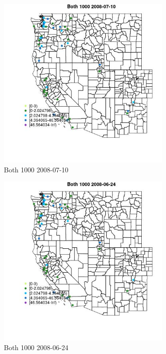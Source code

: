 \begin{figure} 
\centering  
\includegraphics[width=0.77\textwidth]{Code_Outputs/Report_ML_input_PM25_Step4_part_e_de_duplicated_aves_MapObsBoth_10002008-07-10.jpg} 
\caption{\label{fig:Report_ML_input_PM25_Step4_part_e_de_duplicated_avesMapObsBoth_10002008-07-10}Both 1000 2008-07-10} 
\end{figure} 
 

\begin{figure} 
\centering  
\includegraphics[width=0.77\textwidth]{Code_Outputs/Report_ML_input_PM25_Step4_part_e_de_duplicated_aves_MapObsBoth_10002008-06-24.jpg} 
\caption{\label{fig:Report_ML_input_PM25_Step4_part_e_de_duplicated_avesMapObsBoth_10002008-06-24}Both 1000 2008-06-24} 
\end{figure} 
 

